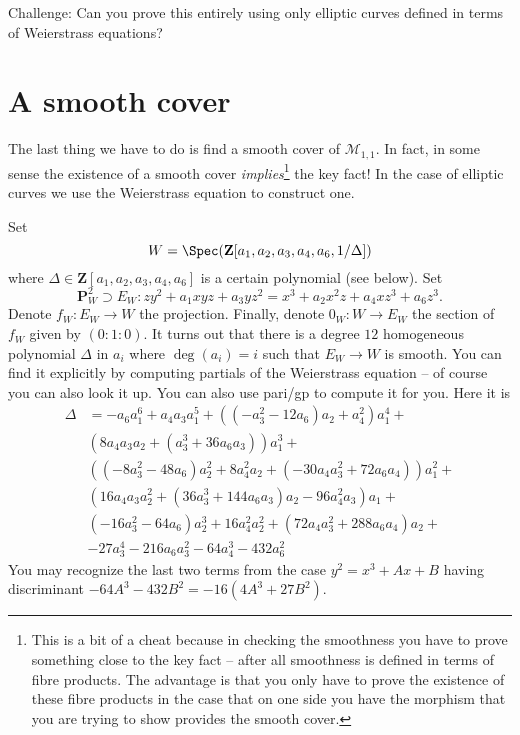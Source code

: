 \medskip\noindent
Challenge: Can you prove this entirely using only elliptic curves
defined in terms of Weierstrass equations?




\section{A smooth cover}
\label{section-smooth}

\noindent
The last thing we have to do is find a smooth cover of $\mathcal{M}_{1, 1}$.
In fact, in some sense the existence of a smooth cover
{\it implies}\footnote{This is a bit of a cheat because
in checking the smoothness you have to prove something close to
the key fact -- after all smoothness is defined in terms of
fibre products. The advantage is that you only have to prove the existence
of these fibre products in the case that on one side you have the morphism
that you are trying to show provides the smooth cover.} the key fact!
In the case of elliptic curves we use the Weierstrass equation to
construct one.

\medskip\noindent
Set
$$
W = \Spec(\mathbf{Z}[a_1, a_2, a_3, a_4, a_6, 1/\Delta])
$$
where $\Delta \in \mathbf{Z}[a_1, a_2, a_3, a_4, a_6]$ is a certain
polynomial (see below). Set
$$
\mathbf{P}_W^2 \supset E_W :
zy^2 + a_1 xyz + a_3 yz^2 = x^3 + a_2x^2z + a_4xz^3 + a_6z^3.
$$
Denote $f_W : E_W \to W$ the projection. Finally, denote $0_W : W \to E_W$
the section of $f_W$ given by $(0 : 1 : 0)$. It turns out that
there is a degree $12$ homogeneous polynomial $\Delta$ in $a_i$
where $\deg(a_i) = i$ such that $E_W \to W$ is smooth.
You can find it explicitly by computing partials of the
Weierstrass equation -- of course you can also look it up. You can
also use pari/gp to compute it for you. Here it is
\begin{align*}
\Delta & = -a_6a_1^6 + a_4a_3a_1^5 + ((-a_3^2 - 12a_6)a_2 + a_4^2)a_1^4 + \\
& (8a_4a_3a_2 + (a_3^3 + 36a_6a_3))a_1^3 + \\
& ((-8a_3^2 - 48a_6)a_2^2 + 8a_4^2a_2 + (-30a_4a_3^2 + 72a_6a_4))a_1^2 + \\
& (16a_4a_3a_2^2 + (36a_3^3 + 144a_6a_3)a_2 - 96a_4^2a_3)a_1 + \\
& (-16a_3^2 - 64a_6)a_2^3 + 16a_4^2a_2^2 + (72a_4a_3^2 + 288a_6a_4)a_2 + \\
& -27a_3^4 - 216a_6a_3^2  -64a_4^3 - 432a_6^2
\end{align*}
You may recognize the last two terms from the case
$y^2 = x^3 + Ax + B$ having discriminant $-64A^3 - 432B^2 = -16(4A^3 + 27B^2)$.

